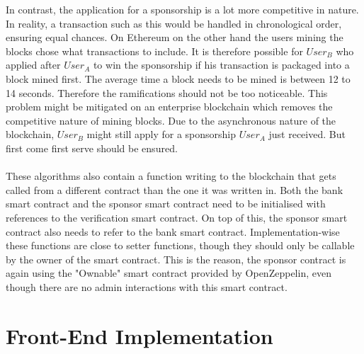 In contrast, the application for a sponsorship is a lot more competitive in nature. In reality, a transaction such as this would be handled in chronological order, ensuring equal chances. On Ethereum on the other hand the users mining the blocks chose what transactions to include. It is therefore possible for $User_B$ who applied after $User_A$ to win the sponsorship if his transaction is packaged into a block mined first. The average time a block needs to be mined is between 12 to 14 seconds. Therefore the ramifications should not be too noticeable. This problem might be mitigated on an enterprise blockchain which removes the competitive nature of mining blocks. Due to the asynchronous nature of the blockchain, $User_B$ might still apply for a sponsorship $User_A$ just received. But first come first serve should be ensured.\\
\\
These algorithms also contain a function writing to the blockchain that gets called from a different contract than the one it was written in. Both the bank smart contract and the sponsor smart contract need to be initialised with references to the verification smart contract. On top of this, the sponsor smart contract also needs to refer to the bank smart contract. Implementation-wise these functions are close to setter functions, though they should only be callable by the owner of the smart contract. This is the reason, the sponsor contract is again using the "Ownable" smart contract provided by OpenZeppelin\cite{Zeppelin}, even though there are no admin interactions with this smart contract.\\
\section{Front-End Implementation}